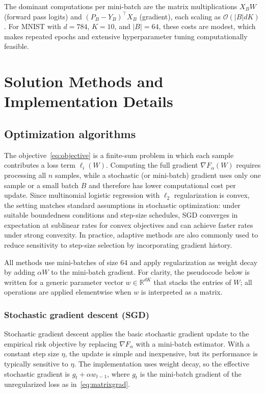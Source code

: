 \documentclass[11pt]{article}
\numberwithin{equation}{section}
\numberwithin{table}{section}
\numberwithin{figure}{section}
\numberwithin{algorithm}{section}
\begin{document}
The dominant computations per mini-batch are the matrix multiplications \(X_BW\) (forward pass logits) and \((P_B-Y_B)^\top X_B\) (gradient), each scaling as \(\mathcal{O}(|B|dK)\). For MNIST with \(d=784\), \(K=10\), and \(|B|=64\), these costs are modest, which makes repeated epochs and extensive hyperparameter tuning computationally feasible.

\section{Solution Methods and Implementation Details}
\subsection{Optimization algorithms}
The objective~\eqref{eq:objective} is a finite-sum problem in which each sample contributes a loss term \(\ell_i(W)\). Computing the full gradient \(\nabla F_\alpha(W)\) requires processing all \(n\) samples, while a stochastic (or mini-batch) gradient uses only one sample or a small batch \(B\) and therefore has lower computational cost per update. Since multinomial logistic regression with \(\ell_2\) regularization is convex, the setting matches standard assumptions in stochastic optimization: under suitable boundedness conditions and step-size schedules, SGD converges in expectation at sublinear rates for convex objectives and can achieve faster rates under strong convexity. In practice, adaptive methods are also commonly used to reduce sensitivity to step-size selection by incorporating gradient history.

All methods use mini-batches of size 64 and apply regularization as weight decay by adding \(\alpha W\) to the mini-batch gradient. For clarity, the pseudocode below is written for a generic parameter vector \(w\in\mathbb{R}^{dK}\) that stacks the entries of \(W\); all operations are applied elementwise when \(w\) is interpreted as a matrix.

\subsubsection{Stochastic gradient descent (SGD)}
Stochastic gradient descent applies the basic stochastic gradient update to the empirical risk objective by replacing \(\nabla F_\alpha\) with a mini-batch estimator. With a constant step size \(\eta\), the update is simple and inexpensive, but its performance is typically sensitive to \(\eta\). The implementation uses weight decay, so the effective stochastic gradient is \(g_t+\alpha w_{t-1}\), where \(g_t\) is the mini-batch gradient of the unregularized loss as in~\eqref{eq:matrixgrad}.
\end{document}
